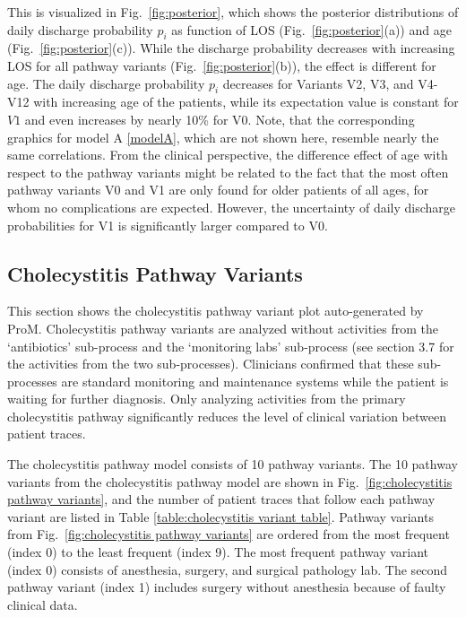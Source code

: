 \documentclass{elsarticle}
\begin{document}
This is visualized in Fig.~\ref{fig:posterior}, which shows the posterior distributions of daily discharge probability $p_i$ as function of LOS (Fig.~\ref{fig:posterior}(a)) and age (Fig.~\ref{fig:posterior}(c)). While the discharge probability decreases with increasing LOS for all pathway variants (Fig.~\ref{fig:posterior}(b)), the effect is different for age. 
The daily discharge probability $p_i$ decreases for Variants V2, V3, and V4-V12 with increasing age of the patients, while its expectation value is constant for $V1$ and even increases by nearly 10\% for V0. Note, that the corresponding graphics for model A \eqref{modelA}, which are not shown here, resemble nearly the same correlations. 
From the clinical perspective, the difference effect of age with respect to the pathway variants might be related to the fact that the most often pathway variants V0 and V1 are only found for older patients of all ages, for whom no complications are expected. 
However, the uncertainty of daily discharge probabilities for V1 is significantly larger compared to V0.
\subsection{Cholecystitis Pathway Variants}
This section shows the cholecystitis pathway variant plot auto-generated by ProM. Cholecystitis pathway variants are analyzed without activities from the `antibiotics' sub-process and the `monitoring labs' sub-process (see section 3.7 for the activities from the two sub-processes). Clinicians confirmed that these sub-processes are standard monitoring and maintenance systems while the patient is waiting for further diagnosis. Only analyzing activities from the primary cholecystitis pathway significantly reduces the level of clinical variation between patient traces.

The cholecystitis pathway model consists of 10 pathway variants. The 10 pathway variants from the cholecystitis pathway model are shown in Fig.~\ref{fig:cholecystitis pathway variants}, and the number of patient traces that follow each pathway variant are listed in Table \ref{table:cholecystitis variant table}. Pathway variants from Fig.~\ref{fig:cholecystitis pathway variants} are ordered from the most frequent (index 0) to the least frequent (index 9). The most frequent pathway variant (index 0) consists of anesthesia, surgery, and surgical pathology lab. The second pathway variant (index 1) includes surgery without anesthesia because of faulty clinical data.
\end{document}
